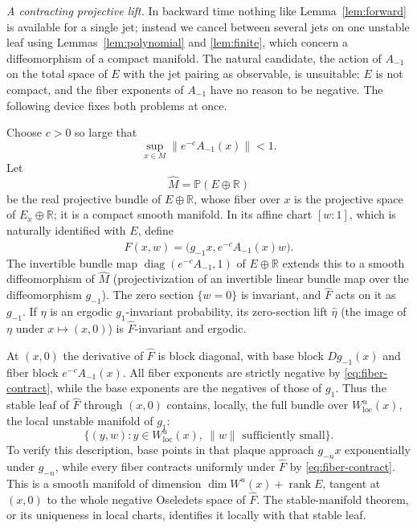 \documentclass[11pt]{article}
\theoremstyle{remark}
\newcommand{\R}{\mathbb R}
\begin{document}
\emph{A contracting projective lift.}
In backward time nothing like Lemma~\ref{lem:forward} is available
for a single jet; instead we cancel between several jets
on one unstable leaf using Lemmas~\ref{lem:polynomial} and
\ref{lem:finite}, which concern a diffeomorphism of a compact
manifold.  The natural candidate, the action of \(A_{-1}\) on the
total space of \(E\) with the jet pairing as observable, is
unsuitable: \(E\) is not compact, and the fiber exponents of
\(A_{-1}\) have no reason to be negative.  The following device fixes
both problems at once.


Choose \(c>0\) so large that
\begin{equation}\label{eq:fiber-contract}
 \sup_{x\in M}\|e^{-c}A_{-1}(x)\|<1.
\end{equation}
Let
\[
 \widehat M=\mathbb P(E\oplus\R)
\]
be the real projective bundle of \(E\oplus\R\), whose fiber over
\(x\) is the projective space of \(E_x\oplus\R\); it is a compact
smooth manifold.
In its affine chart \([w:1]\), which is naturally identified with \(E\),
define
\begin{equation}\label{eq:lift}
 \widehat F(x,w)=\bigl(g_{-1}x,e^{-c}A_{-1}(x)w\bigr).
\end{equation}
The invertible bundle map \(\operatorname{diag}(e^{-c}A_{-1},1)\)
of \(E\oplus\R\) extends this to a smooth diffeomorphism of
\(\widehat M\) (projectivization of an invertible linear bundle map
over the diffeomorphism \(g_{-1}\)).
The zero section \(\{w=0\}\) is invariant, and \(\widehat F\) acts
on it as \(g_{-1}\).
If \(\eta\) is an ergodic \(g_1\)-invariant probability, its
zero-section lift \(\widehat\eta\) (the image of \(\eta\) under
\(x\mapsto(x,0)\)) is \(\widehat F\)-invariant and ergodic.

At \((x,0)\) the derivative of \(\widehat F\) is block diagonal, with
base block \(Dg_{-1}(x)\) and fiber block \(e^{-c}A_{-1}(x)\).
All fiber exponents are strictly negative by
\eqref{eq:fiber-contract}, while the base exponents are the negatives
of those of \(g_1\).  Thus the stable leaf of \(\widehat F\) through
\((x,0)\) contains, locally, the full bundle over
\(W^u_{\mathrm{loc}}(x)\), the local unstable manifold of \(g_1\):
\begin{equation}\label{eq:lifted-leaf}
 \{(y,w):y\in W^u_{\mathrm{loc}}(x),\ \|w\|\text{ sufficiently small}\}.
\end{equation}
To verify this description, base points in that plaque approach
\(g_{-n}x\) exponentially under \(g_{-n}\), while every fiber
contracts uniformly under \(\widehat F\) by \eqref{eq:fiber-contract}.
This is a smooth manifold of dimension
\(\dim W^u(x)+\operatorname{rank}E\), tangent at \((x,0)\) to the whole
negative Oseledets space of \(\widehat F\).
The stable-manifold theorem, or its uniqueness in local charts,
identifies it locally with that stable leaf.
\end{document}
